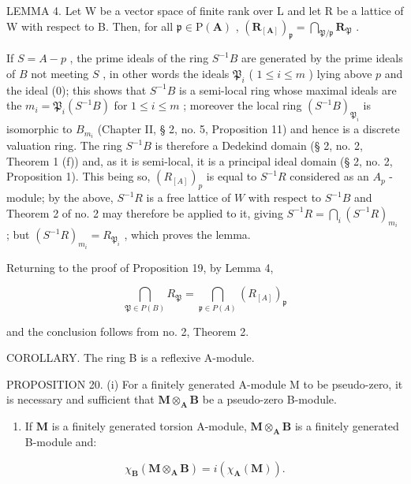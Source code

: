 LEMMA 4. Let W be a vector space of finite rank over L and let R be a lattice of W with respect to B. Then, for all \(\mathfrak{p} \in \mathrm{P}(\mathbf{A})\) , \((\mathbf{R}_{[\mathbf{A}]})_{\mathfrak{p}} = \bigcap_{\mathfrak{P}/\mathfrak{p}} \mathbf{R}_{\mathfrak{P}}\) .

If \(S = A - p\) , the prime ideals of the ring \(S^{-1}B\) are generated by the prime ideals of \(B\) not meeting \(S\) , in other words the ideals \(\mathfrak{P}_i\) ( \(1 \leqslant i \leqslant m\) ) lying above \(p\) and the ideal (0); this shows that \(S^{-1}B\) is a semi-local ring whose maximal ideals are the \(m_i = \mathfrak{P}_i(S^{-1}B)\) for \(1 \leqslant i \leqslant m\) ; moreover the local ring \((S^{-1}B)_{\mathfrak{P}_i}\) is isomorphic to \(B_{m_i}\) (Chapter II, § 2, no. 5, Proposition 11) and hence is a discrete valuation ring. The ring \(S^{-1}B\) is therefore a Dedekind domain (§ 2, no. 2, Theorem 1 (f)) and, as it is semi-local, it is a principal ideal domain (§ 2, no. 2, Proposition 1). This being so, \((R_{[A]})_p\) is equal to \(S^{-1}R\) considered as an \(A_p\) -module; by the above, \(S^{-1}R\) is a free lattice of \(W\) with respect to \(S^{-1}B\) and Theorem 2 of no. 2 may therefore be applied to it, giving \(S^{-1}R = \bigcap_i (S^{-1}R)_{m_i}\) ; but \((S^{-1}R)_{m_i} = R_{\mathfrak{P}_i}\) , which proves the lemma.

Returning to the proof of Proposition 19, by Lemma 4,

\[
\bigcap_ {\mathfrak {P} \in P (B)} R _ {\mathfrak {P}} = \bigcap_ {\mathfrak {p} \in P (A)} \left(R _ {[ A ]}\right) _ {\mathfrak {p}}
\]

and the conclusion follows from no. 2, Theorem 2.

COROLLARY. The ring B is a reflexive A-module.

PROPOSITION 20. (i) For a finitely generated A-module M to be pseudo-zero, it is necessary and sufficient that \(\mathbf{M} \otimes_{\mathbf{A}} \mathbf{B}\) be a pseudo-zero B-module.

\begin{enumerate}
\def\labelenumi{(\roman{enumi})}
\setcounter{enumi}{1}
\tightlist
\item
  If \(\mathbf{M}\) is a finitely generated torsion A-module, \(\mathbf{M} \otimes_{\mathbf{A}} \mathbf{B}\) is a finitely generated B-module and:
\end{enumerate}

\[
\chi_ {\mathbf {B}} (\mathbf {M} \otimes_ {\mathbf {A}} \mathbf {B}) = i (\chi_ {\mathbf {A}} (\mathbf {M})).\tag{22}
\]

